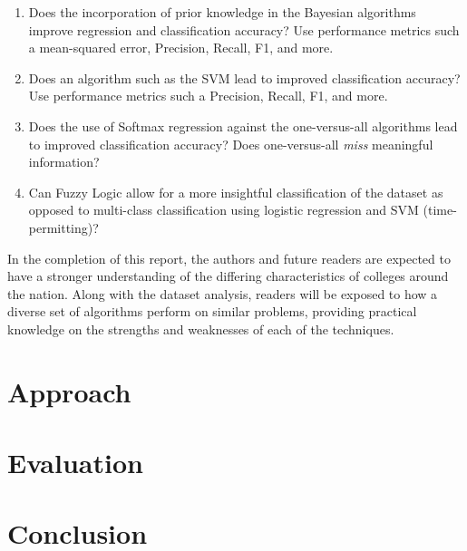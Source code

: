 \documentclass[10pt]{article}
\begin{document}
\begin{enumerate}
	\item Does the incorporation of prior knowledge in the Bayesian algorithms improve regression and classification accuracy? Use performance metrics such a mean-squared error, Precision, Recall, F1, and more.
    \item Does an algorithm such as the SVM lead to improved classification accuracy? Use performance metrics such a Precision, Recall, F1, and more.
    \item Does the use of Softmax regression against the one-versus-all algorithms lead to improved classification accuracy? Does one-versus-all \textit{miss} meaningful information?
    \item Can Fuzzy Logic allow for a more insightful classification of the dataset as opposed to multi-class classification using logistic regression and SVM (time-permitting)?
\end{enumerate}

In the completion of this report, the authors and future readers are expected to have a stronger understanding of the differing characteristics of colleges around the nation. Along with the dataset analysis, readers will be exposed to how a diverse set of algorithms perform on similar problems, providing practical knowledge on the strengths and weaknesses of each of the techniques.  
    
\section*{Approach} 
    
\section*{Evaluation}


\section*{Conclusion}



\end{document}
